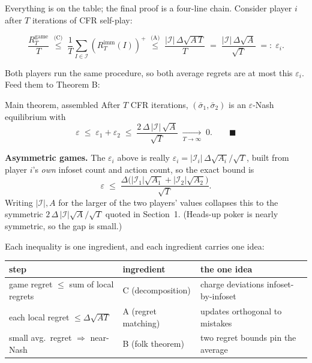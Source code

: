 \documentclass[11pt,a4paper]{article}
\newcommand{\pos}[1]{\left(#1\right)^{\!+}}
\begin{document}
Everything is on the table; the final proof is a four-line chain. Consider
player $i$ after $T$ iterations of CFR self-play:

\[
\frac{R_T^{\mathrm{game}}}{T}
\;\overset{\text{(C)}}{\le}\;
\frac{1}{T}\sum_{I\in\mathcal{I}} \pos{R_T^{\mathrm{imm}}(I)}
\;\overset{\text{(A)}}{\le}\;
\frac{|\mathcal{I}|\,\Delta\sqrt{A\,T}}{T}
\;=\;
\frac{|\mathcal{I}|\,\Delta\sqrt{A}}{\sqrt{T}}
\;=:\; \varepsilon_i .
\]

Both players run the same procedure, so both average regrets are at most
this $\varepsilon_i$. Feed them to Theorem B:

\begin{thmbox}{Main theorem, assembled}
After $T$ CFR iterations, $(\bar\sigma_1, \bar\sigma_2)$ is an
$\varepsilon$-Nash equilibrium with
\[
\varepsilon \;\le\; \varepsilon_1 + \varepsilon_2
\;\le\; \frac{2\,\Delta\,|\mathcal{I}|\,\sqrt{A}}{\sqrt{T}}
\;\xrightarrow[T\to\infty]{}\; 0 . \qquad\blacksquare
\]
\end{thmbox}

\textbf{Asymmetric games.} The $\varepsilon_i$ above is really
$\varepsilon_i = |\mathcal{I}_i|\,\Delta\sqrt{A_i}/\sqrt{T}$, built from player
$i$'s \emph{own} infoset count and action count, so the exact bound is
\[
\varepsilon \;\le\; \frac{\Delta\bigl(|\mathcal{I}_1|\sqrt{A_1}
   + |\mathcal{I}_2|\sqrt{A_2}\bigr)}{\sqrt{T}}.
\]
Writing $|\mathcal{I}|,A$ for the larger of the two players' values collapses
this to the symmetric $2\,\Delta\,|\mathcal{I}|\sqrt{A}/\sqrt{T}$ quoted in
Section~1. (Heads-up poker is nearly symmetric, so the gap is small.)

Each inequality is one ingredient, and each ingredient carries one idea:

\begin{center}
\small
\begin{tabular}{@{}lll@{}}
\toprule
step & ingredient & the one idea \\
\midrule
game regret $\le$ sum of local regrets & C (decomposition) & charge deviations infoset-by-infoset \\
each local regret $\le \Delta\sqrt{AT}$ & A (regret matching) & updates orthogonal to mistakes \\
small avg.\ regret $\Rightarrow$ near-Nash & B (folk theorem) & two regret bounds pin the average \\
\bottomrule
\end{tabular}
\end{center}
\end{document}
